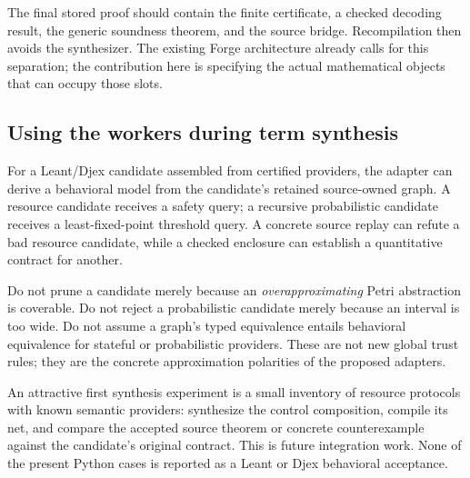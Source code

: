 The final stored proof should contain the finite certificate, a checked decoding result, the generic soundness theorem, and the source bridge. Recompilation then avoids the synthesizer. The existing Forge architecture already calls for this separation; the contribution here is specifying the actual mathematical objects that can occupy those slots.

\subsection{Using the workers during term synthesis}
For a Leant/Djex candidate assembled from certified providers, the adapter can derive a behavioral model from the candidate's retained source-owned graph. A resource candidate receives a safety query; a recursive probabilistic candidate receives a least-fixed-point threshold query. A concrete source replay can refute a bad resource candidate, while a checked enclosure can establish a quantitative contract for another.

Do not prune a candidate merely because an \emph{overapproximating} Petri abstraction is coverable. Do not reject a probabilistic candidate merely because an interval is too wide. Do not assume a graph's typed equivalence entails behavioral equivalence for stateful or probabilistic providers. These are not new global trust rules; they are the concrete approximation polarities of the proposed adapters.

An attractive first synthesis experiment is a small inventory of resource protocols with known semantic providers: synthesize the control composition, compile its net, and compare the accepted source theorem or concrete counterexample against the candidate's original contract. This is future integration work. None of the present Python cases is reported as a Leant or Djex behavioral acceptance.

